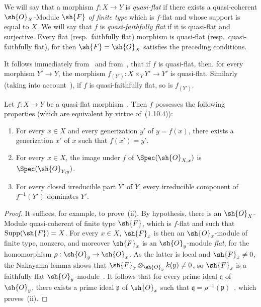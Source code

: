 \begin{env}[2.3.3]
\label{IV.2.3.3}
We will say that a morphism $f:X\to Y$ is \emph{quasi-flat} if there exists a quasi-coherent $\sh{O}_X$-Module $\sh{F}$ \emph{of finite type} which is $f$-flat and whose support is equal to $X$.
We will say that $f$ is \emph{quasi-faithfully flat} if it is quasi-flat and surjective.
Every flat (resp.\ faithfully flat) morphism is quasi-flat (resp.\ quasi-faithfully flat), for then $\sh{F}=\sh{O}_X$ satisfies the preceding conditions.
\end{env}

It follows immediately from~ and from~, that if $f$ is quasi-flat, then, for every morphism $Y'\to Y$, the morphism $f_{(Y')}:X\times_Y Y'\to Y'$ is quasi-flat.
Similarly (taking into account~), if $f$ is quasi-faithfully flat, so is $f_{(Y')}$.

\begin{proposition}[2.3.4]
\label{IV.2.3.4}
Let $f:X\to Y$ be a quasi-flat morphism~. Then $f$ possesses the following properties \textnormal{(}which are equivalent by virtue of~(1.10.4)\textnormal{)}:
\begin{enumerate}
  \item[(i)] For every $x\in X$ and every generization $y'$ of $y=f(x)$, there exists a generization $x'$ of $x$ such that $f(x')=y'$.
  \item[(ii)] For every $x\in X$, the image under $f$ of $\Spec(\sh{O}_{X,x})$ is $\Spec(\sh{O}_{Y,y})$.
  \item[\emph{(iii)}] For every closed irreducible part $Y'$ of $Y$, every irreducible component of $f^{-1}(Y')$ dominates $Y'$.
\end{enumerate}
\end{proposition}

\begin{proof}
It suffices, for example, to prove~(ii).
By hypothesis, there is an $\sh{O}_X$-Module quasi-coherent of finite type $\sh{F}$, which is $f$-flat and such that $\operatorname{Supp}(\sh{F})=X$.
For every $x\in X$, $\sh{F}_x$ is then an $\sh{O}_x$-module of finite type, nonzero, and moreover $\sh{F}_x$ is an $\sh{O}_y$-module \emph{flat}, for the homomorphism $\rho:\sh{O}_y\to\sh{O}_x$.
As the latter is local and $\sh{F}_x\neq 0$, the Nakayama lemma shows that $\sh{F}_x\otimes_{\sh{O}_y}k(y)\neq 0$, so $\sh{F}_x$ is a faithfully flat $\sh{O}_y$-module~.
It follows that for every prime ideal $\mathfrak{q}$ of $\sh{O}_y$, there exists a prime ideal $\mathfrak{p}$ of $\sh{O}_x$ such that $\mathfrak{q}=\rho^{-1}(\mathfrak{p})$~, which proves~(ii).
\end{proof}

